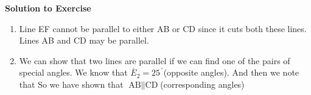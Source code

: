 {\begin{mdframed}[linewidth=4, leftmargin=40, rightmargin=40]
\begin{exercise}
\label{m39370*eip-668}\noindent\textbf{Solution to Exercise }
  \label{m39370*eip-82}\begin{enumerate}[noitemsep, label=\textbf{Step} \textbf{\arabic*}. ] 
            \leftskip=20pt\rightskip=\leftskip\item Line EF cannot be parallel to either AB or CD since it cuts both these lines. Lines AB and CD may be parallel.\item We can show that two lines are parallel if we can find one of the pairs of special angles. We know that 
\begin{math}{\stackrel{ˆ}{E}}_{2}={25}^{\ensuremath{{\,}^{\circ}}}\end{math}(opposite angles). And then we note that 
\label{m39370*eid6634}\nopagebreak\noindent{}
     So we have shown that 
\begin{math}\text{AB}\parallel \text{CD}\end{math}\hspace{1ex}(corresponding angles)\end{enumerate}
        


    \end{exercise}
    \end{mdframed}
    }
    \noindent
  \label{m39370*secfhsst!!!underscore!!!id550}
